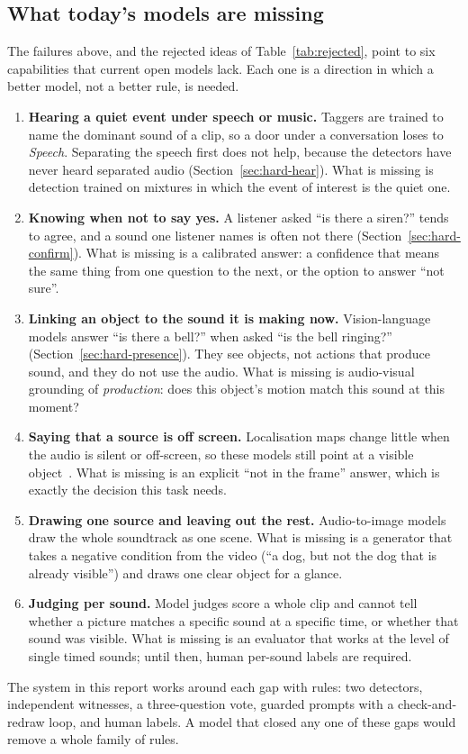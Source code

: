 \subsection{What today's models are missing}\label{sec:missing}
The failures above, and the rejected ideas of Table~\ref{tab:rejected}, point to six capabilities that current open
models lack. Each one is a direction in which a better model, not a better rule, is needed.
\begin{enumerate}
  \item \textbf{Hearing a quiet event under speech or music.} Taggers are trained to name the dominant sound of a clip, so a
        door under a conversation loses to \emph{Speech}. Separating the speech first does not help, because the
        detectors have never heard separated audio (Section~\ref{sec:hard-hear}). What is missing is detection trained on
        mixtures in which the event of interest is the quiet one.
  \item \textbf{Knowing when not to say yes.} A listener asked ``is there a siren?'' tends to agree, and a sound one listener
        names is often not there (Section~\ref{sec:hard-confirm}). What is missing is a calibrated answer: a confidence that means the same
        thing from one question to the next, or the option to answer ``not sure''.
  \item \textbf{Linking an object to the sound it is making now.} Vision-language models answer ``is there a bell?'' when asked
        ``is the bell ringing?'' (Section~\ref{sec:hard-presence}). They see objects, not actions that produce sound, and
        they do not use the audio. What is missing is audio-visual grounding of \emph{production}: does this object's
        motion match this sound at this moment?
  \item \textbf{Saying that a source is off screen.} Localisation maps change little when the audio is silent or
        off-screen, so these models still point at a visible object~\cite{juanola2025critical}. What is missing is an explicit
        ``not in the frame'' answer, which is exactly the decision this task needs.
  \item \textbf{Drawing one source and leaving out the rest.} Audio-to-image models draw the whole soundtrack as one scene.
        What is missing is a generator that takes a negative condition from the video (``a dog, but not the dog that is
        already visible'') and draws one clear object for a glance.
  \item \textbf{Judging per sound.} Model judges score a whole clip and cannot tell whether a picture matches a specific
        sound at a specific time, or whether that sound was visible. What is missing is an evaluator that works at the
        level of single timed sounds; until then, human per-sound labels are required.
\end{enumerate}
The system in this report works around each gap with rules: two detectors, independent witnesses, a three-question
vote, guarded prompts with a check-and-redraw loop, and human labels. A model that closed any one of these gaps would
remove a whole family of rules.
